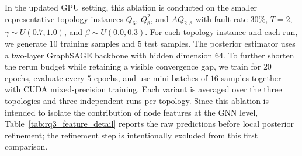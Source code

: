 In the updated GPU setting, this ablation is conducted on the smaller representative topology instances $Q_6$, $Q_8^2$, and $AQ_{2,8}$ with fault rate $30\%$, $T=2$, $\gamma \sim U(0.7, 1.0)$, and $\beta \sim U(0.0, 0.3)$. For each topology instance and each run, we generate $10$ training samples and $5$ test samples. The posterior estimator uses a two-layer GraphSAGE backbone with hidden dimension $64$. To further shorten the rerun budget while retaining a visible convergence gap, we train for $20$ epochs, evaluate every $5$ epochs, and use mini-batches of $16$ samples together with CUDA mixed-precision training. Each variant is averaged over the three topologies and three independent runs per topology. Since this ablation is intended to isolate the contribution of node features at the GNN level, Table~\ref{tab:rq3_feature_detail} reports the raw predictions before local posterior refinement; the refinement step is intentionally excluded from this first comparison.


